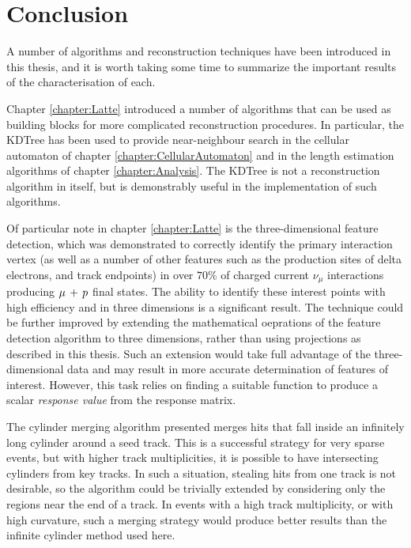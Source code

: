 \chapter{Conclusion}\label{chapter:Conclusion}
A number of algorithms and reconstruction techniques have been introduced in this thesis, and it is worth taking some time to summarize the important results of the characterisation of each.

Chapter \ref{chapter:Latte} introduced a number of algorithms that can be used as building blocks for more complicated reconstruction procedures. In particular, the KDTree has been used to provide near-neighbour search in the cellular automaton of chapter \ref{chapter:CellularAutomaton} and in the length estimation algorithms of chapter \ref{chapter:Analysis}. The KDTree is not a reconstruction algorithm in itself, but is demonstrably useful in the implementation of such algorithms.

Of particular note in chapter \ref{chapter:Latte} is the three-dimensional feature detection, which was demonstrated to correctly identify the primary interaction vertex (as well as a number of other features such as the production sites of delta electrons, and track endpoints) in over $70\%$ of charged current $\nu_\mu$ interactions producing $\mu\,+\,p$ final states. The ability to identify these interest points with high efficiency and in three dimensions is a significant result. The technique could be further improved by extending the mathematical oeprations of the feature detection algorithm to three dimensions, rather than using projections as described in this thesis. Such an extension would take full advantage of the three-dimensional data and may result in more accurate determination of features of interest. However, this task relies on finding a suitable function to produce a scalar \emph{response value} from the response matrix.

The cylinder merging algorithm presented merges hits that fall inside an infinitely long cylinder around a seed track. This is a successful strategy for very sparse events, but with higher track multiplicities, it is possible to have intersecting cylinders from key tracks. In such a situation, stealing hits from one track is not desirable, so the algorithm could be trivially extended by considering only the regions near the end of a track. In events with a high track multiplicity, or with high curvature, such a merging strategy would produce better results than the infinite cylinder method used here.

